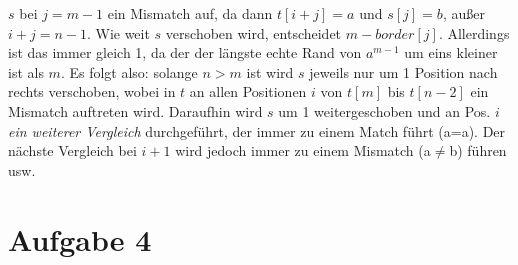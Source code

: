 \documentclass[a4paper,10pt,oneside,leqno]{scrartcl}
\begin{document}
\begin{itemize}
\begin{itemize}
  $s$ bei $j=m-1$ ein Mismatch auf, da dann $t[i+j] = a$ und $s[j]=b$, außer $i+j=n-1$. Wie weit $s$ verschoben wird, entscheidet
  $m-border[j]$. Allerdings ist das immer gleich 1, da der der längste echte Rand von $a^{m-1}$ um eins kleiner ist als $m$.\newline
  Es folgt also: solange $n>m$ ist wird $s$ jeweils nur um 1 Position nach rechts verschoben, wobei in $t$ an allen Positionen $i$ von $t[m]$ bis
  $t[n-2]$ ein Mismatch auftreten wird. Daraufhin wird $s$ um 1 weitergeschoben und an Pos. $i$ \textit{ein weiterer Vergleich} durchgeführt,
  der immer zu einem Match führt (a=a). Der nächste Vergleich bei $i+1$ wird jedoch immer zu einem Mismatch (a$\neq$b) führen usw.
\end{itemize}

\end{itemize}

\section*{Aufgabe 4}
\end{document}
